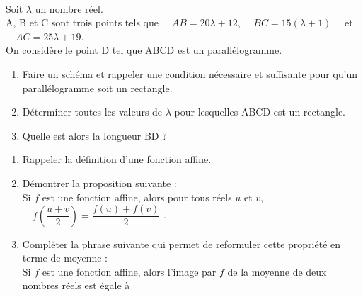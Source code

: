 \documentclass[a4paper,12pt,french]{article}
\begin{document}

\exo{}\\
Soit $\lambda$ un nombre réel.\\
A, B et C sont trois points tels que $\quad AB=20\lambda +12$, $\quad BC=15(\lambda+1)\quad$ et $\quad AC=25\lambda +19$.\\
On considère le point D tel que ABCD est un parallélogramme.
\begin{enumerate}[\bfseries 1.]
	\item 	Faire un schéma et rappeler une condition nécessaire et suffisante pour qu'un parallélogramme soit un rectangle.
	\item 	Déterminer toutes les valeurs de $\lambda$ pour lesquelles ABCD est un rectangle.
	\item	 Quelle est alors la longueur BD ?\\
\end{enumerate}




\exo{}
\begin{enumerate}[\bfseries 1.]
	\item 	Rappeler la définition d'une fonction affine.
	\item 	Démontrer la proposition suivante :\\
			\og Si $f$ est une fonction affine, alors pour tous réels $u$ et $v$, $\quad f\left(\dfrac{u+v}{2}\right)=\dfrac{f(u)+f(v)}{2}$ \fg.
	\item	Compléter la phrase suivante qui permet de reformuler cette propriété en terme de moyenne :\\
	Si $f$ est une fonction affine, alors l'image par $f$ de la moyenne de deux nombres réels est égale à \dotfill\\
\end{enumerate}
\end{document}
